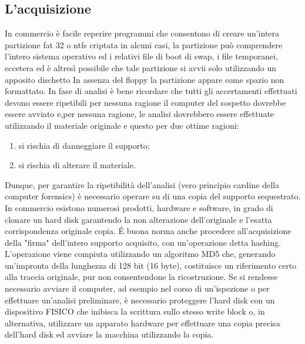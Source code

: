 \subsection{L'acquisizione}
In commercio è facile reperire programmi che consentono di creare un'intera partizione fat 32 o ntfs criptata in alcuni casi, la partizione può comprendere l'intero sistema operativo ed i relativi file di boot di swap, i file temporanei, eccetera ed è altresì possibile che tale partizione si avvii solo utilizzando un apposito dischetto In
assenza del floppy la partizione appare come spazio non formattato. In fase di analisi è bene ricordare che tutti gli accertamenti effettuati devono essere ripetibili per nessuna ragione il computer del sospetto dovrebbe essere avviato e,per nessuna ragione, le analisi dovrebbero essere effettuate utilizzando il materiale
originale e questo per due ottime ragioni:
\begin{enumerate}
    \item si rischia di danneggiare il supporto;
    \item si rischia di alterare il materiale.
\end{enumerate}
Dunque, per garantire la ripetibilità dell'analisi (vero principio cardine della computer forensics) è necessario operare su di una copia del supporto sequestrato. In commercio esistono numerosi prodotti, hardware e software, in grado di clonare un hard disk garantendo la non alterazione dell'originale e l'esatta corrispondenza originale copia. \'E buona norma anche procedere all'acquisizione della "firma" dell'intero supporto acquisito, con un'operazione detta hashing. L'operazione viene compiuta utilizzando un algoritmo MD5 che, generando un'impronta della lunghezza
di 128 bit (16 byte), costituisce un riferimento certo alla traccia originale, pur non consentendone la ricostruzione. Se si rendesse necessario avviare il computer, ad esempio nel corso di un'ispezione o per effettuare un'analisi preliminare, è necessario proteggere l'hard disk con un dispositivo FISICO che inibisca la scrittura sullo stesso write block o, in alternativa, utilizzare un apparato hardware per effettuare una copia precisa dell'hard disk ed avviare la macchina utilizzando la copia.

